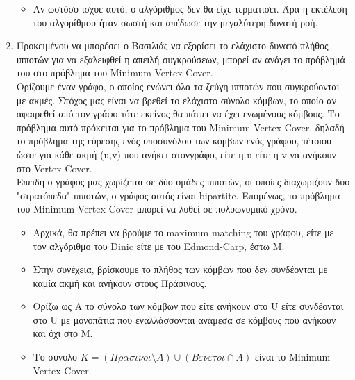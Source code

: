 \documentclass{article}
\begin{document}
\begin{enumerate}
\begin{itemize}
\item Αν ωστόσο ίσχυε αυτό, ο αλγόριθμος δεν θα είχε τερματίσει. Άρα η εκτέλεση του αλγορίθμου ήταν σωστή και απέδωσε την μεγαλύτερη δυνατή ροή.  
\end{itemize}
\item Προκειμένου να μπορέσει ο Βασιλιάς να εξορίσει το ελάχιστο δυνατό πλήθος ιπποτών για να εξαλειφθεί η απειλή συγκρούσεων, μπορεί αν ανάγει το πρόβλημά του στο πρόβλημα του Minimum Vertex Cover. \\
Ορίζουμε έναν γράφο, ο οποίος ενώνει όλα τα ζεύγη ιπποτών που συγκρούονται με ακμές. Στόχος μας είναι να βρεθεί το ελάχιστο σύνολο κόμβων, το οποίο αν αφαιρεθεί από τον γράφο τότε εκείνος θα πάψει να έχει ενωμένους κόμβους. Το πρόβλημα αυτό πρόκειται για το πρόβλημα του Minimum Vertex Cover, δηλαδή το πρόβλημα της εύρεσης ενός υποσυνόλου των κόμβων ενός γράφου, τέτοιου ώστε για κάθε ακμή (u,v)  που ανήκει στονγράφο, είτε η u είτε η v να ανήκουν στο Vertex Cover. \\
Επειδή ο γράφος μας χωρίζεται σε δύο ομάδες ιπποτών, οι οποίες διαχωρίζουν δύο "στρατόπεδα" ιπποτών, ο γράφος αυτός είναι bipartite. Επομένως, το πρόβλημα του Minimum Vertex Cover μπορεί να λυθεί σε πολυωνυμικό χρόνο. \\
\begin{itemize}
\item Αρχικά, θα πρέπει να βρούμε το maximum matching του γράφου, είτε με τον αλγόριθμο του Dinic είτε με του Edmond-Carp, έστω M.
\item Στην συνέχεια, βρίσκουμε το πλήθος των κόμβων που δεν συνδέονται με καμία ακμή και ανήκουν στους Πράσινους.
\item Ορίζω ως Α το σύνολο των κόμβων που είτε ανήκουν στο U είτε συνδέονται στο U  με μονοπάτια που εναλλάσσονται ανάμεσα σε κόμβους που ανήκουν και όχι στο Μ. 
\item Το σύνολο $K = (Πρασινοι \setminus Α) \cup (Βενετοι \cap Α)$ είναι το Minimum Vertex Cover. 
\end{itemize}

\end{enumerate}
\end{document}
